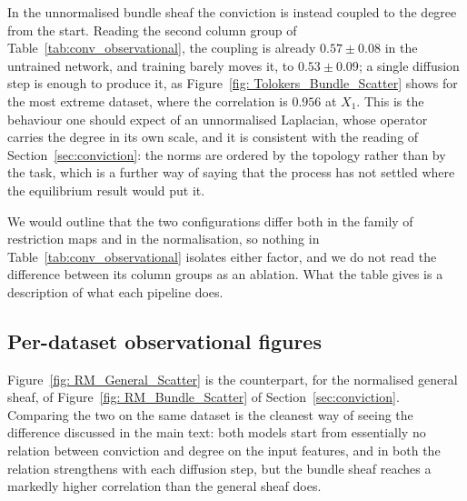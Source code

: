 In the unnormalised bundle sheaf the conviction is instead coupled to the degree
from the start. Reading the second column group of
Table~\ref{tab:conv_observational}, the coupling is already $0.57 \pm 0.08$ in the untrained
network, and training barely moves it, to $0.53 \pm 0.09$; a single diffusion
step is enough to produce it, as Figure~\ref{fig: Tolokers_Bundle_Scatter} shows
for the most extreme dataset, where the correlation is $0.956$ at $X_1$. This is
the behaviour one should expect of an unnormalised Laplacian, whose operator carries
the degree in its own scale, and it is consistent with the reading of
Section~\ref{sec:conviction}: the norms are ordered by the topology rather than
by the task, which is a further way of saying that the process has not settled
where the equilibrium result would put it.

We would outline that the two configurations differ both in the family of
restriction maps and in the normalisation, so nothing in
Table~\ref{tab:conv_observational} isolates either factor, and we do not read
the difference between its column groups as an ablation. What the table gives is
a description of what each pipeline does.



\subsection{Per-dataset observational figures}
\label{sec:supp_conv_scatter}

Figure~\ref{fig: RM_General_Scatter} is the counterpart, for the normalised
general sheaf, of Figure~\ref{fig: RM_Bundle_Scatter} of
Section~\ref{sec:conviction}. Comparing the two on the same dataset is the
cleanest way of seeing the difference discussed in the main text: both models
start from essentially no relation between conviction and degree on the input
features, and in both the relation strengthens with each diffusion step, but the
bundle sheaf reaches a markedly higher correlation than the general sheaf does.

